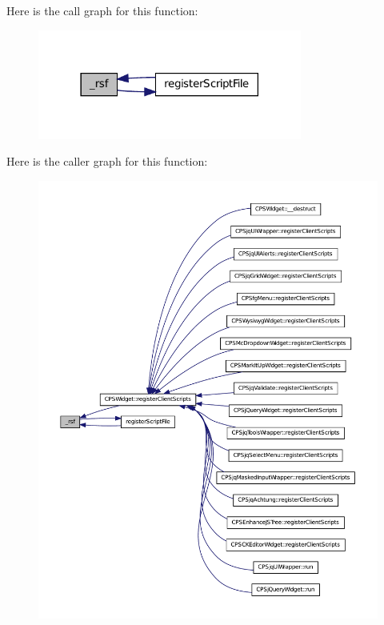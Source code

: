 Here is the call graph for this function:\nopagebreak
\begin{figure}[H]
\begin{center}
\leavevmode
\includegraphics[width=246pt]{classCPSHelperBase_ae5089c4caea1197b2462a18eda83ca8c_cgraph}
\end{center}
\end{figure}




Here is the caller graph for this function:\nopagebreak
\begin{figure}[H]
\begin{center}
\leavevmode
\includegraphics[width=400pt]{classCPSHelperBase_ae5089c4caea1197b2462a18eda83ca8c_icgraph}
\end{center}
\end{figure}


